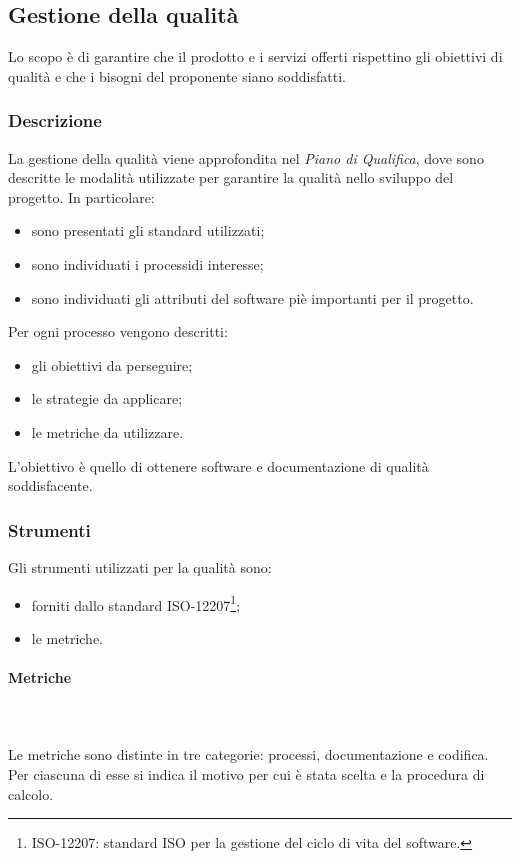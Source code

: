 \subsection{Gestione della qualità}
Lo scopo è di garantire che il prodotto e i servizi offerti rispettino gli obiettivi di qualità e che i bisogni del proponente siano soddisfatti. 

\subsubsection{Descrizione}
La gestione della qualità viene approfondita nel \textit{Piano di Qualifica}, dove sono descritte le modalità utilizzate per garantire la qualità nello sviluppo del progetto. In particolare: \begin{itemize}
\item sono presentati gli standard utilizzati;
\item sono individuati i processi\glo di interesse;
\item sono individuati gli attributi del software piè importanti per il progetto.
\end{itemize}
Per ogni processo vengono descritti: \begin{itemize}
\item gli obiettivi da perseguire;
\item le strategie da applicare;
\item le metriche da utilizzare.
\end{itemize}
L'obiettivo è quello di ottenere software e documentazione di qualità soddisfacente.

\subsubsection{Strumenti}
Gli strumenti utilizzati per la qualità sono:
\begin{itemize}
\item forniti dallo standard ISO-12207\footnote{ISO-12207: standard ISO per la gestione del ciclo di vita del software.};
\item le metriche.
\end{itemize}

\paragraph{Metriche} \mbox{} \\ \mbox{} \\
Le metriche sono distinte in tre categorie: processi, documentazione e codifica. Per ciascuna di esse si indica il motivo per cui è stata scelta e la procedura di calcolo.

